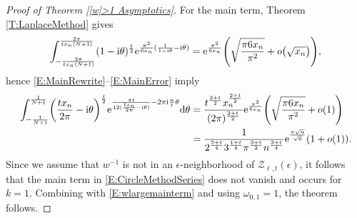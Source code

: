 \begin{proof}[Proof of Theorem \ref{|w|>1 Asymptotics}]
For the main term, Theorem \ref{T:LaplaceMethod} gives
\begin{equation}\label{E:MainError}
\int_{-\frac{2\pi}{tx_n(N+1)}}^{\frac{2\pi}{tx_n(N+1)}} (1-{\rm i}\theta)^{\frac{t}{2}}{\rm e}^{\frac{\pi^2}{6x_n}( \frac{1}{1-{\rm i}\theta}- {\rm i}\theta)}={\rm e}^{\frac{\pi^2}{6x_n}}\Biggl(\sqrt{\frac{\pi6x_n}{\pi^2}}+o\big( \sqrt{x_n}\big)\Biggr),
\end{equation}
hence \eqref{E:MainRewrite}--\eqref{E:MainError} imply
\begin{align}
 \int_{-\frac{1}{N+1}}^{\frac{1}{N+1}} \biggl(\frac{tx_n}{2\pi}-{\rm i}\theta\biggr)^{\frac{t}{2}}{\rm e}^{\frac{\pi t}{12(\frac{tx_n}{2\pi}-{\rm i}\theta)}-2\pi {\rm i} \frac{n}{t} \theta} {\rm d}\theta
 &{}=\frac{t^{\frac{2+t}{2}}x_n^{\frac{2+t}{2}}}{(2\pi)^{\frac{2+t}{2}}}{\rm e}^{\frac{\pi^2}{6x_n}}\Biggl(\sqrt{\frac{\pi6x_n}{\pi^2}}+o( 1) \Biggr) \nonumber \\
 &{}=\frac{1}{2^{\frac{5+t}{4}}3^{\frac{1+t}{4}}\pi^{\frac{3+t}{2}}n^{\frac{3+t}{4}}}{\rm e}^{\frac{\pi\sqrt{n}}{\sqrt{6}}}(1+o(1)). \label{E:wlargemainterm}
\end{align}
Since we assume that $w^{-1}$ is not in an $\epsilon$-neighborhood of $\mathcal{Z}_{\ell,t}(\epsilon)$, it follows that the main term in \eqref{E:CircleMethodSeries} does not vanish and occurs for $k=1$. Combining with \eqref{E:wlargemainterm} and using $\omega_{0,1}=1$, the theorem follows.
\end{proof}
